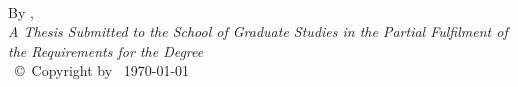 \documentclass[
11pt, %
oneside, %
english, %
singlespacing, %
]{McMasterThesis} %
\begin{document}
\begin{center}

\vfill
\textsc{\Large \ttitle} \\

\vfill
By \authorname, \\%



 
 \vfill
{\large \textit{A Thesis Submitted to the School of Graduate Studies in the Partial Fulfilment of the Requirements for the Degree \degreename}}\\


\vfill
{\large \univname\, \copyright\, Copyright by \authorname\, \today}\\[4cm] %


\end{center}
\end{document}
